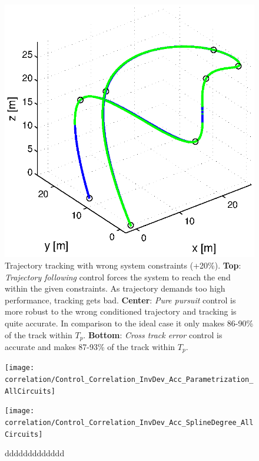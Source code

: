 \begin{figure}[h]
  \hfill
  \begin{minipage}[t]{0.32\textwidth}
    \includegraphics[width = \textwidth]{trackings_wc/figure_3D_agile_SplineDegree3_crossTrack_Disturbance_0}
  \end{minipage}
  \caption{Trajectory tracking with wrong system constraints (+20\%). {\bf Top}: \textit{Trajectory following} control forces the system to reach the end within the given constraints. As trajectory demands too high performance, tracking gets bad. {\bf Center}: \textit{Pure pursuit} control is more robust to the wrong conditioned trajectory and tracking is quite accurate. In comparison to the ideal case it only makes 86-90\% of the track within $T_p$. {\bf Bottom}: \textit{Cross track error} control is accurate and makes 87-93\% of the track within $T_p$.}
  \label{fig:results_model_uncertainties}
\end{figure}

\begin{figure}[h]
  \begin{minipage}[t]{0.48\textwidth}
    \texttt{[image: correlation/Control\_Correlation\_InvDev\_Acc\_Parametrization\_AllCircuits]}
  \end{minipage}
  \hfill
  \begin{minipage}[t]{0.48\textwidth}
    \texttt{[image: correlation/Control\_Correlation\_InvDev\_Acc\_SplineDegree\_AllCircuits]}
  \end{minipage}
  \caption{ddddddddddddd}
  \label{fig:correlation_invdev_acc_all_circuits}
\end{figure}

